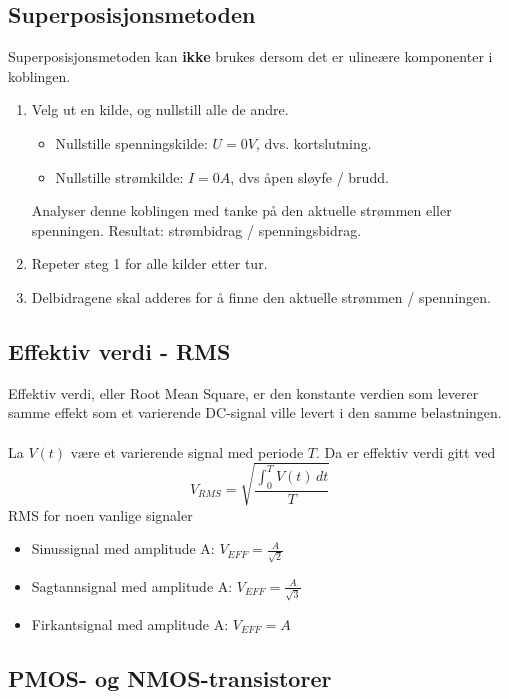 \documentclass{article}
\begin{document}
\subsection{Superposisjonsmetoden}
Superposisjonsmetoden kan \textbf{ikke} brukes dersom det er ulineære komponenter i koblingen.
\begin{enumerate}
    \item Velg ut en kilde, og nullstill alle de andre. \begin{itemize}
        \item Nullstille spenningskilde: $U = 0V$, dvs. kortslutning.
        \item Nullstille strømkilde: $I = 0A$, dvs åpen sløyfe / brudd.
    \end{itemize}
    Analyser denne koblingen med tanke på den aktuelle strømmen eller spenningen. Resultat: strømbidrag / spenningsbidrag.
    \item Repeter steg 1 for alle kilder etter tur.
    \item Delbidragene skal adderes for å finne den aktuelle strømmen / spenningen.
\end{enumerate}

\subsection{Effektiv verdi - RMS}
Effektiv verdi, eller Root Mean Square, er den konstante verdien som leverer samme effekt som et varierende DC-signal ville levert i den samme belastningen.\\\\
La $V(t)$ være et varierende signal med periode $T$. Da er effektiv verdi gitt ved
\[V_{RMS} = \sqrt{\frac{\int_0^T V(t)\,dt}{T}}\]
RMS for noen vanlige signaler
\begin{itemize}
    \item Sinussignal med amplitude A: $V_{EFF} = \frac{A}{\sqrt{2}}$
    \item Sagtannsignal med amplitude A: $V_{EFF} = \frac{A}{\sqrt{3}}$
    \item Firkantsignal med amplitude A: $V_{EFF} = A$
\end{itemize}

\subsection{PMOS- og NMOS-transistorer}
\end{document}

